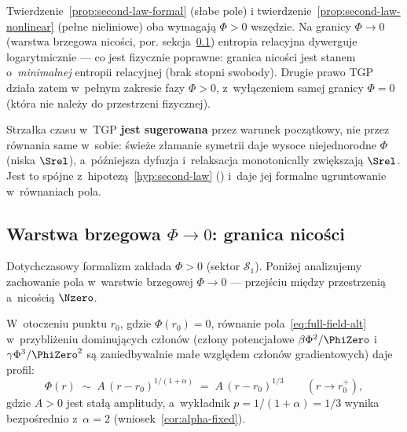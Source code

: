 \begin{remark}\label{rem:second-law-scope}
Twierdzenie~\ref{prop:second-law-formal} (s\l{}abe pole) i
twierdzenie~\ref{prop:second-law-nonlinear} (pe\l{}ne nieliniowe)
oba wymagaj\k{a} $\Phi > 0$ wsz\k{e}dzie. Na granicy
$\Phi \to 0$ (warstwa brzegowa nico\'sci, por.
sekcja~\ref{ssec:boundary-layer}) entropia relacyjna
dywerguje logarytmicznie --- co jest fizycznie poprawne:
granica nico\'sci jest stanem o~\emph{minimalnej} entropii
relacyjnej (brak stopni swobody). Drugie prawo TGP
dzia\l{}a zatem w~pe\l{}nym zakresie fazy $\Phi > 0$,
z~wy\l{}\k{a}czeniem samej granicy $\Phi = 0$
(kt\'ora nie nale\.zy do przestrzeni fizycznej).
\end{remark}

\begin{remark}
Strza\l{}ka czasu w~TGP \textbf{jest sugerowana} przez warunek pocz\k{a}tkowy,
nie przez r\'ownania same w~sobie: \'swie\.ze z\l{}amanie symetrii daje
wysoce niejednorodne $\Phi$ (niska $\Srel$), a~p\'o\'zniejsza
dyfuzja i~relaksacja monotonically zwi\k{e}kszaj\k{a}
$\Srel$. Jest to sp\'ojne z~hipotez\k{a}~\ref{hyp:second-law}
() i~daje jej formalne ugruntowanie w~r\'ownaniach pola.
\end{remark}

\subsection{Warstwa brzegowa $\Phi \to 0$: granica
  nico\'sci}\label{ssec:boundary-layer}

Dotychczasowy formalizm zak\l{}ada $\Phi > 0$ (sektor
$\mathcal{S}_1$). Poni\.zej analizujemy zachowanie pola
w~warstwie brzegowej $\Phi \to 0$ --- przej\'sciu mi\k{e}dzy
przestrzeni\k{a} a~nico\'sci\k{a} $\Nzero$.

\begin{proposition}\label{prop:boundary-exponent}
W~otoczeniu punktu $r_0$, gdzie $\Phi(r_0) = 0$,
r\'ownanie pola~\eqref{eq:full-field-alt} w~przybli\.zeniu
dominuj\k{a}cych cz\l{}on\'ow (cz\l{}ony potencja\l{}owe
$\beta\Phi^2/\PhiZero$ i~$\gamma\Phi^3/\PhiZero^2$ s\k{a}
zaniedbywalnie ma\l{}e wzgl\k{e}dem cz\l{}on\'ow
gradientowych) daje profil:
\begin{equation}\label{eq:boundary-profile}
    \boxed{
    \Phi(r) \;\sim\; A\,(r - r_0)^{1/(1+\alpha)}
    \;=\; A\,(r - r_0)^{1/3}
    }
    \qquad (r \to r_0^+),
\end{equation}
gdzie $A > 0$ jest sta\l{}\k{a} amplitudy, a~wyk\l{}adnik
$p = 1/(1+\alpha) = 1/3$ wynika bezpo\'srednio
z~$\alpha = 2$ (wniosek~\ref{cor:alpha-fixed}).
\end{proposition}

